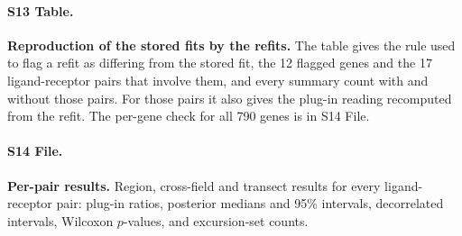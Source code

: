 \documentclass[10pt,letterpaper]{article}
\begin{document}
\paragraph*{S13 Table.}
\label{S13_Table}
\textbf{Reproduction of the stored fits by the refits.} The table gives the rule used to flag a refit as differing from the stored fit, the 12 flagged genes and the 17 ligand-receptor pairs that involve them, and every summary count with and without those pairs. For those pairs it also gives the plug-in reading recomputed from the refit. The per-gene check for all 790 genes is in S14 File.

\paragraph*{S14 File.}
\label{S14_File}
\textbf{Per-pair results.} Region, cross-field and transect results for every ligand-receptor pair: plug-in ratios, posterior medians and 95\% intervals, decorrelated intervals, Wilcoxon $p$-values, and excursion-set counts.
\end{document}
